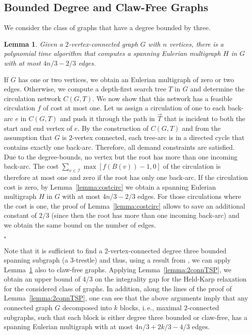 \documentclass[letterpaper,11pt]{article}
\newtheorem{lemma}[theorem]{Lemma}
\newenvironment{proof}{\begin{trivlist}
\item[\hskip\labelsep {\bf Proof}.]}{\QED \end{trivlist}}
\newcommand{\QED}{\hfill $\square$}
\newcommand{\oa}[1]{\ensuremath{\overrightarrow{#1}}}
\begin{document}
\subsection{Bounded Degree and Claw-Free Graphs}
We consider the class of graphs that have a degree bounded by three.
\begin{lemma}\label{lem:boundeddeg}
  Given a $2$-vertex-connected graph $G$ with $n$ vertices, there is a
  polynomial time algorithm that computes a spanning Eulerian
  multigraph $H$ in $G$ with at most $4n/3 - 2/3$ edges.
\end{lemma}
\begin{proof}
  If $G$ has one or two vertices, we obtain an Eulerian multigraph of
  zero or two edges. Otherwise, we compute a depth-first search tree
  $T$ in $G$ and determine the circulation network $C(G,T)$. We now
  show that this network has a feasible circulation $f$ of cost at
  most one. Let us assign a circulation of one to each back-arc $e$ in
  $C(G,T)$ and push it through the path in $\oa{T}$ that is incident
  to both the start and end vertex of $e$. By the construction of
  $C(G,T)$ and from the assumption that $G$ is $2$-vertex connected,
  each tree-arc is in a directed cycle that contains exactly one
  back-arc. Therefore, all demand constraints are satisfied. Due to
  the degree-bounds, no vertex but the root has more than one incoming
  back-arc. The cost $\sum_{v\in\mathcal{I}} \max[f(B(v))-1, 0]$ of
  the circulation is therefore at most one and zero if the root has
  only one back-arc.  If the circulation cost is zero, by
  Lemma~\ref{lemma:costcirc} we obtain a spanning Eulerian multigraph
  $H$ in $G$ with at most $4n/3-2/3$ edges. For those circulations
  where the cost is one, the proof of Lemma~\ref{lemma:costcirc}
  allows to save an additional constant of $2/3$ (since then the root
  has more than one incoming back-arc) and we obtain the same bound on
  the number of edges.

\end{proof}
Note that it is sufficient to find a 2-vertex-connected
degree three bounded spanning subgraph (a 3-trestle) and thus, using a
result from \cite{KKN01}, we can apply Lemma~\ref{lem:boundeddeg} also
to claw-free graphs.  Applying Lemma~\ref{lemma:2connTSP}, we obtain
an upper bound of 4/3 on the integrality gap for the Held-Karp
relaxation for the considered class of graphs. In addition, along the
lines of the proof of Lemma~\ref{lemma:2connTSP}, one can see that the
above arguments imply that any connected graph $G$ decomposed into $k$
blocks, i.\,e., maximal $2$-connected subgraphs, such that each block is
either degree three bounded or claw-free, has a spanning Eulerian
multigraph with at most $4n/3 + 2k/3- 4/3$ edges.
\end{document}
